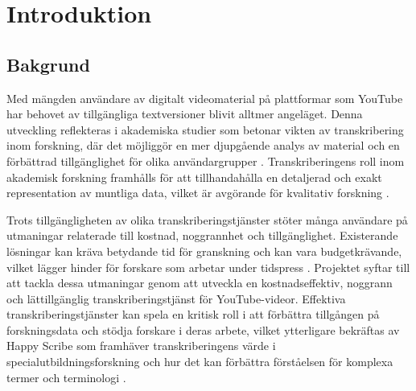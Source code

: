 \chapter{Introduktion}

\section{Bakgrund}
Med mängden användare av digitalt videomaterial på plattformar som YouTube har
behovet av tillgängliga textversioner blivit alltmer angeläget. Denna
utveckling reflekteras i akademiska studier som betonar vikten av
transkribering inom forskning, där det möjliggör en mer djupgående analys av
material och en förbättrad tillgänglighet för olika användargrupper
\cite{RevBlog2019}. Transkriberingens roll inom akademisk forskning
framhålls för att tillhandahålla en detaljerad och exakt representation av
muntliga data, vilket är avgörande för kvalitativ forskning
\cite{OxfordAcademicND}.

Trots tillgängligheten av olika transkriberingstjänster stöter många användare
på utmaningar relaterade till kostnad, noggrannhet och tillgänglighet.
Existerande lösningar kan kräva betydande tid för granskning och kan vara
budgetkrävande, vilket lägger hinder för forskare som arbetar under tidspress
\cite{RevBlog2019}. Projektet syftar till att tackla dessa utmaningar genom
att utveckla en kostnadseffektiv, noggrann och lättillgänglig
transkriberingstjänst för YouTube-videor. Effektiva transkriberingstjänster
kan spela en kritisk roll i att förbättra tillgången på forskningsdata och
stödja forskare i deras arbete, vilket ytterligare bekräftas av Happy Scribe
som framhäver transkriberingens värde i specialutbildningsforskning och hur
det kan förbättra förståelsen för komplexa termer och terminologi
\cite{HappyScribeND}.

